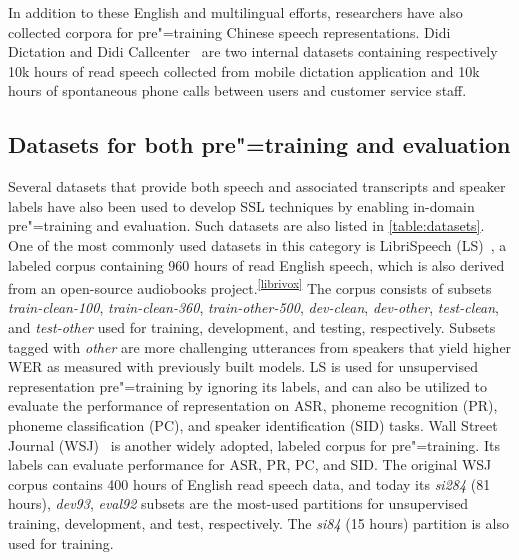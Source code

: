 In addition to these English and multilingual efforts, researchers have also
collected corpora for pre"=training Chinese speech representations. Didi Dictation
and Didi Callcenter~\parencite{jiang_improving_2019, jiang_further_2021} are two
internal datasets containing respectively 10k hours of read speech collected
from mobile dictation application and 10k hours of spontaneous phone calls
between users and customer service staff.

\subsection{Datasets for both pre"=training and evaluation}\label{sec:datasets}
Several datasets that provide both speech and associated transcripts and
speaker labels have also been used to develop SSL techniques by enabling
in-domain pre"=training and evaluation. Such datasets are also listed in
\cref{table:datasets}. One of the most commonly used datasets in this category
is LibriSpeech (LS)~\parencite{panayotov_librispeech_2015}, a labeled corpus
containing 960 hours of
read English speech, which is also derived from an open-source audiobooks
project.\textsuperscript{\ref{librivox}} The corpus consists of subsets
\textit{train-clean-100}, \textit{train-clean-360}, \textit{train-other-500},
\textit{dev-clean}, \textit{dev-other}, \textit{test-clean}, and
\textit{test-other} used for training, development, and testing, respectively.
Subsets tagged with \textit{other} are more challenging utterances from
speakers that yield higher WER as measured with previously built models. LS is
used for unsupervised representation pre"=training by ignoring its labels, and
can also be utilized to evaluate the performance of representation on ASR, phoneme recognition (PR),
phoneme classification (PC), and speaker identification (SID) tasks. Wall Street Journal (WSJ)~\parencite{paul_design_1992} is another
widely adopted, labeled corpus for pre"=training. Its labels can evaluate
performance for ASR, PR, PC, and SID. The original WSJ corpus contains 400 hours
of English read speech data, and today its \textit{si284} (81 hours),
\textit{dev93}, \textit{eval92} subsets are the most-used partitions for
unsupervised training, development, and test, respectively.  The \textit{si84}
(15 hours) partition is also used for training.

